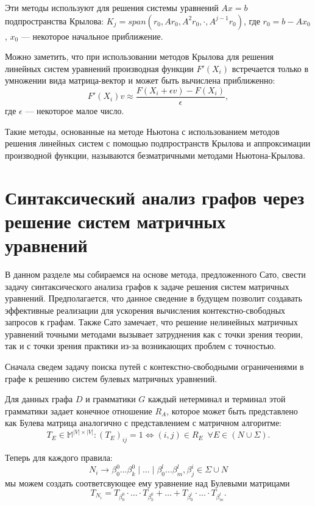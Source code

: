 \documentclass[12pt]{matmex-diploma-custom}
\begin{document}
Эти методы используют для решения системы уравнений $Ax = b$ подпространства Крылова: $K_j = span(r_0, Ar_0, A^2r_0, \cdot, A^{j-1}r_0)$, где $r_0 = b - A x_0$, $x_0$ --- некоторое начальное приближение.

Можно заметить, что при использовании методов Крылова для решения линейных систем уравнений производная функции $F'(X_i)$ встречается только в умножении вида матрица-вектор и может быть вычислена приближенно:
$$F'(X_i)v \approx \frac{F(X_i + \epsilon v) - F(X_i)}{\epsilon},$$
где $\epsilon$ --- некоторое малое число.

Такие методы, основанные на методе Ньютона с использованием методов решения линейных систем с помощью подпространств Крылова и аппроксимации производной функции, называются безматричными методами Ньютона-Крылова.



\section{Синтаксический анализ графов через решение систем матричных уравнений}

В данном разделе мы собираемся на основе метода, предложенного Сато, свести задачу синтаксического анализа графов к задаче решения систем матричных уравнений. Предполагается, что данное сведение в будущем позволит создавать эффективные реализации для ускорения вычисления контекстно-свободных запросов к графам. Также Сато замечает, что решение нелинейных матричных уравнений точными методами вызывает затруднения как с точки зрения теории, так и с точки зрения практики из-за возникающих проблем с точностью. 


Сначала сведем задачу поиска путей с контекстно-свободными ограничениями в графе к решению систем булевых матричных уравнений.  


Для данных графа $D$ и грамматики $G$ каждый нетерминал и терминал этой грамматики задает конечное отношение $R_A$, которое может быть представлено как Булева матрица аналогично с представлением с матричном алгоритме: 
$$T_E \in \mathbb{M}^{|V| \times |V|}: (T_{E})_{ij} = 1 \iff (i,j) \in R_E \; \  \forall E \in (N \cup \Sigma).$$

Теперь для каждого правила:
$$N_i \to \beta^0_0 \dots \beta^0_k \mid \ldots \mid \beta^l_0 \dots \beta^l_m, \beta^i_j \in \Sigma \cup N$$
мы можем создать соответсвующее ему уравнение над Булевыми матрицами
$$T_{N_i} = T_{\beta^0_0}\cdot \ldots \cdot T_{\beta^0_k} + \ldots + T_{\beta^l_0}\cdot \ldots \cdot T_{\beta^l_m}.$$
\end{document}
